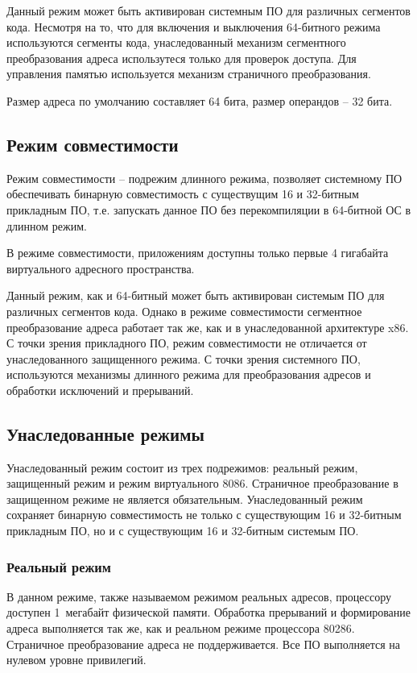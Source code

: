 Данный режим может быть активирован системным ПО для различных сегментов кода. Несмотря
на то, что для включения и выключения 64-битного режима используются сегменты кода,
унаследованный механизм сегментного преобразования адреса использутеся только для проверок доступа.
Для управления памятью используется механизм страничного преобразования.

Размер адреса по умолчанию составляет 64 бита, размер операндов -- 32 бита.

\subsection{Режим совместимости}
Режим совместимости -- подрежим длинного режима, позволяет системному ПО обеспечивать
бинарную совместимость с существущим 16 и 32-битным прикладным ПО,
т.е. запускать данное ПО без перекомпиляции в 64-битной ОС в длинном режим.

В режиме совместимости, приложениям доступны только первые 4 гигабайта виртуального адресного пространства.

Данный режим, как и 64-битный может быть активирован системым ПО для различных сегментов кода.
Однако в режиме совместимости сегментное преобразование адреса работает так же, как и в унаследованной
архитектуре x86. С точки зрения прикладного ПО, режим совместимости не отличается от унаследованного
защищенного режима. С точки зрения системного ПО, используются механизмы длинного режима для преобразования
адресов и обработки исключений и прерываний.

\subsection{Унаследованные режимы}
Унаследованный режим состоит из трех подрежимов: реальный режим, защищенный режим и режим виртуального 8086.
Страничное преобразование в защищенном режиме не является обязательным. Унаследованный режим сохраняет
бинарную совместимость не только с существующим 16 и 32-битным прикладным ПО, но и с существующим 16 и 32-битным
системым ПО.

\subsubsection*{Реальный режим}
В данном режиме, также называемом режимом реальных адресов, процессору доступен 1~мегабайт физической памяти.
Обработка прерываний и формирование адреса выполняется так же, как и реальном режиме процессора 80286.
Страничное преобразование адреса не поддерживается. Все ПО выполняется на нулевом уровне привилегий.

